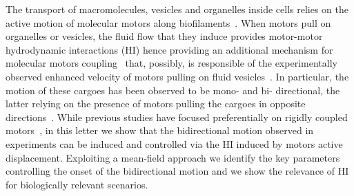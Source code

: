 \documentclass[prl,aps,twocolumn, floatfix, superscriptaddress,showpacs]{revtex4}
\begin{document}
\maketitle

The transport of macromolecules, vesicles and organelles inside cells relies on the active motion of molecular motors along biofilaments~\cite{Howard}. When motors  pull on  organelles or vesicles, the  fluid flow that they  induce provides motor-motor hydrodynamic interactions (HI) hence providing an additional mechanism for molecular motors coupling~\cite{Malgaretti} that, possibly, is responsible of the experimentally observed enhanced velocity of motors pulling on fluid vesicles~\cite{Nelson2014}. 
In particular, the motion of these cargoes has been observed to be mono- and bi- directional, the latter relying on the presence of motors pulling the cargoes in opposite directions~\cite{Ma,Warshaw,Kunwar2011,badoual,Nebenfuhr01121999,Hendricks,goldman2010}. 
While previous studies have focused preferentially on rigidly coupled motors~\cite{Julicher1995,Julicher1997,Lipowsky2010, Guerin2011}, in this letter we show that the bidirectional motion observed in experiments can be induced and controlled via the HI induced by motors active displacement. Exploiting a mean-field approach we identify the key parameters controlling the onset of the bidirectional motion and we show the relevance of HI for biologically relevant scenarios.
% 
%  
\end{document}

